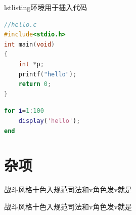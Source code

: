 \documentclass[bachelor]{XJTUthesis}
\begin{document}
lstlisting环境用于插入代码
\begin{lstlisting}[language=c++]
//hello.c
#include<stdio.h>
int main(void)
{
    int *p;
    printf("hello");
    return 0;
}
\end{lstlisting}

\begin{lstlisting}[language=matlab]
for i=1:100
    display('hello');
end
\end{lstlisting}

\chapter{杂项}

\begin{appendixs}
战斗风格十色入规范司法和v角色发v就是
\end{appendixs}

\begin{appendixs}
战斗风格十色入规范司法和v角色发v就是
\end{appendixs}

\begin{acknowledgement}
\chaptername
\end{acknowledgement}

\end{document}
